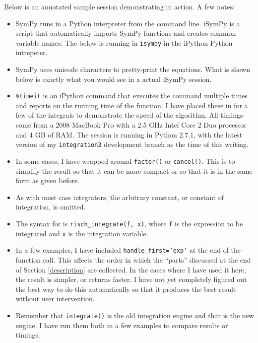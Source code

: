 Below is an annotated sample session demonstrating \rischintegrate{} in action.  A few notes:
\begin{itemize}
\item SymPy runs in a Python interpreter from the command line. iSymPy is
a script that automatically imports SymPy functions and creates common
variable names.  The below is running in \texttt{isympy} in the iPython
Python intrepeter.

\item SymPy uses unicode characters to pretty-print the equations. 
What is shown below is exactly what you would see in a actual iSymPy
session.

\item \texttt{\%timeit} is an iPython command that executes the command
multiple times and reports on the running time of the function. I have
placed these in for a few of the integrals to demonstrate the speed of
the algorithm.  All timings come from a 2008 MacBook Pro with a 2.5 GHz
Intel Core 2 Duo processor and 4 GB of RAM.  The session is running in
Python 2.7.1, with the latest version of my \texttt{integration3}
development branch as the time of this writing.  

\item In some cases, I have wrapped \rischintegrate{} around
\texttt{factor()} or \texttt{cancel()}.  This is to simplify the result
so that it can be more compact or so that it is in the same form as
given before.

\item As with most \glspl{cas} integrators, the arbitrary constant, or
constant of integration, is omitted.  

\item The syntax for \rischintegrate{} is \texttt{risch\_integrate(f, x)},
where \texttt{f} is the expression to be integrated and \texttt{x} is
the integration variable.

\item In a few examples, I have included \texttt{handle\_first='exp'} at
the end of the \rischintegrate{} function call.  This affects the order in
which the ``parts'' discussed at the end of Section \ref{description}
are collected.  In the cases where I have used it here, the result is
simpler, or returns faster.  I have not yet completely figured out the
best way to do this automatically so that it produces the best result
without user intervention.  

\item Remember that \texttt{integrate()} is the old \gls{integration}
engine and that \rischintegrate{} is the new engine.  I have run them both in a
few examples to compare results or timings.  


\end{itemize}
